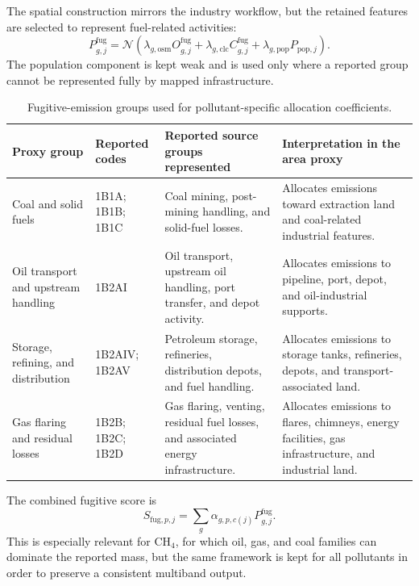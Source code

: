 The spatial construction mirrors the industry workflow, but the retained
features are selected to represent fuel-related activities:
\begin{equation}
  P_{g,j}^{\mathrm{fug}} =
  \mathcal{N}
  \left(
    \lambda_{g,\mathrm{osm}} O_{g,j}^{\mathrm{fug}}
    + \lambda_{g,\mathrm{clc}} C_{g,j}^{\mathrm{fug}}
    + \lambda_{g,\mathrm{pop}} P_{\mathrm{pop},j}
  \right).
  \label{eq:fugitive-group-proxy}
\end{equation}
The population component is kept weak and is used only where a reported
group cannot be represented fully by mapped infrastructure.

\begin{table}[htbp]
  \centering
  \caption{Fugitive-emission groups used for pollutant-specific allocation coefficients.}
  \label{tab:fugitive-alpha-groups}
  \scriptsize
  \begin{tabular}{p{} p{} p{} p{}}
    \toprule
    Proxy group & Reported codes & Reported source groups represented & Interpretation in the area proxy \\
    \midrule
    Coal and solid fuels &
    1B1A; 1B1B; 1B1C &
    Coal mining, post-mining handling, and solid-fuel losses. &
    Allocates emissions toward extraction land and coal-related industrial features. \\
    Oil transport and upstream handling &
    1B2AI &
    Oil transport, upstream oil handling, port transfer, and depot activity. &
    Allocates emissions to pipeline, port, depot, and oil-industrial supports. \\
    Storage, refining, and distribution &
    1B2AIV; 1B2AV &
    Petroleum storage, refineries, distribution depots, and fuel handling. &
    Allocates emissions to storage tanks, refineries, depots, and transport-associated land. \\
    Gas flaring and residual losses &
    1B2B; 1B2C; 1B2D &
    Gas flaring, venting, residual fuel losses, and associated energy infrastructure. &
    Allocates emissions to flares, chimneys, energy facilities, gas infrastructure, and industrial land. \\
    \bottomrule
  \end{tabular}
\end{table}

The combined fugitive score is
\begin{equation}
  S_{\mathrm{fug},p,j} =
  \sum_g
  \alpha_{g,p,c(j)} P_{g,j}^{\mathrm{fug}} .
  \label{eq:fugitive-composite}
\end{equation}
This is especially relevant for CH$_4$, for which oil, gas, and coal
families can dominate the reported mass, but the same framework is kept
for all pollutants in order to preserve a consistent multiband output.

